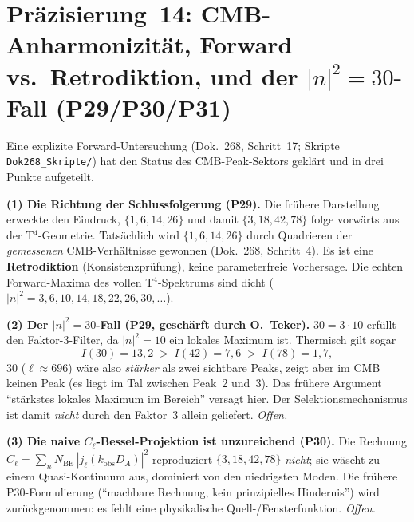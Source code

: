 \section{\texorpdfstring{Präzisierung~14: CMB-Anharmonizität, Forward vs.\ Retrodiktion, und der $|n|^2=30$-Fall (P29/P30/P31)}{Praezisierung 14: CMB-Anharmonizitaet, Forward vs Retrodiktion}}

Eine explizite Forward-Untersuchung (Dok.~268, Schritt~17; Skripte
\texttt{Dok268\_Skripte/}) hat den Status des CMB-Peak-Sektors geklärt und
in drei Punkte aufgeteilt.

\textbf{(1) Die Richtung der Schlussfolgerung (P29).}
Die frühere Darstellung erweckte den Eindruck, $\{1,6,14,26\}$ und damit
$\{3,18,42,78\}$ folge vorwärts aus der T$^4$-Geometrie. Tatsächlich wird
$\{1,6,14,26\}$ durch Quadrieren der \emph{gemessenen} CMB-Verhältnisse
gewonnen (Dok.~268, Schritt~4). Es ist eine \textbf{Retrodiktion}
(Konsistenzprüfung), keine parameterfreie Vorhersage. Die echten
Forward-Maxima des vollen T$^4$-Spektrums sind dicht
($|n|^2=3,6,10,14,18,22,26,30,\ldots$).

\textbf{(2) Der $|n|^2=30$-Fall (P29, geschärft durch O.~Teker).}
$30=3\cdot10$ erfüllt den Faktor-3-Filter, da $|n|^2=10$ ein lokales
Maximum ist. Thermisch gilt sogar
\[
  I(30)=13{,}2 \;>\; I(42)=7{,}6 \;>\; I(78)=1{,}7,
\]
$30$ ($\ell\approx696$) wäre also \emph{stärker} als zwei sichtbare Peaks,
zeigt aber im CMB keinen Peak (es liegt im Tal zwischen Peak~2 und~3). Das
frühere Argument ``stärkstes lokales Maximum im Bereich'' versagt hier. Der
Selektionsmechanismus ist damit \emph{nicht} durch den Faktor~3 allein
geliefert. \emph{Offen.}

\textbf{(3) Die naive $C_\ell$-Bessel-Projektion ist unzureichend (P30).}
Die Rechnung $C_\ell=\sum_n N_\mathrm{BE}\,|j_\ell(k_\mathrm{obs}D_A)|^2$
reproduziert $\{3,18,42,78\}$ \emph{nicht}; sie wäscht zu einem
Quasi-Kontinuum aus, dominiert von den niedrigsten Moden. Die frühere
P30-Formulierung (``machbare Rechnung, kein prinzipielles Hindernis'') wird
zurückgenommen: es fehlt eine physikalische Quell-/Fensterfunktion. \emph{Offen.}

